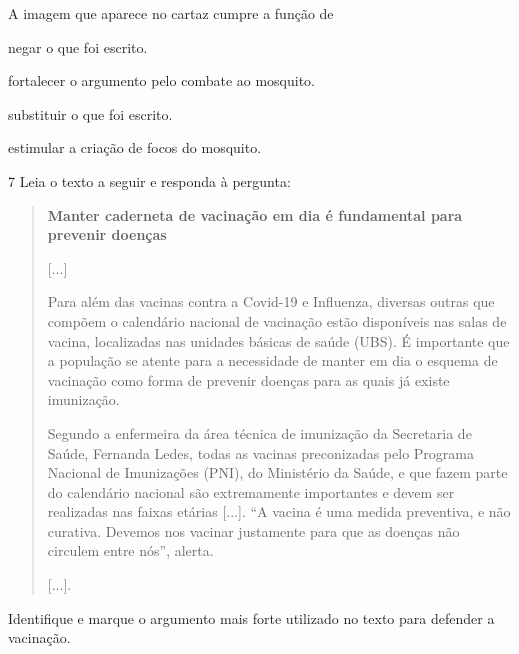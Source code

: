 A imagem que aparece no cartaz cumpre a função de

\begin{escolha}
\item negar o que foi escrito.

\item fortalecer o argumento pelo combate ao mosquito.

\item substituir o que foi escrito.

\item estimular a criação de focos do mosquito.
\end{escolha}


\num{7} Leia o texto a seguir e responda à pergunta:

\begin{quote}
\textbf{Manter caderneta de vacinação em dia é fundamental para prevenir
doenças}

{[}...{]}

Para além das vacinas contra a Covid-19 e Influenza, diversas outras que
compõem o calendário nacional de vacinação estão disponíveis nas salas
de vacina, localizadas nas unidades básicas de saúde (UBS). É importante
que a população se atente para a necessidade de manter em dia o esquema
de vacinação como forma de prevenir doenças para as quais já existe
imunização.

Segundo a enfermeira da área técnica de imunização da Secretaria de
Saúde, Fernanda Ledes, todas as vacinas preconizadas pelo Programa
Nacional de Imunizações (PNI), do Ministério da Saúde, e que fazem parte
do calendário nacional são extremamente importantes e devem ser
realizadas nas faixas etárias {[}...{]}. “A vacina é uma medida
preventiva, e não curativa. Devemos nos vacinar justamente para que as
doenças não circulem entre nós”, alerta.

{[}...{]}.

\end{quote}

Identifique e marque o argumento mais forte utilizado no texto para defender a
vacinação.

